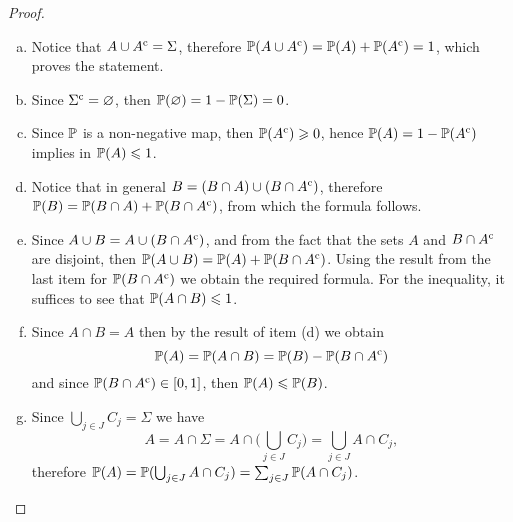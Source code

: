 \begin{proof}
    \begin{enumerate}[(a)]\setlength\itemsep{0em}
        \item Notice that \(A \cup {A}^{\text{c}} = \Sigma\), therefore \(\operatorname{\mathbb{P}}(A \cup
              {A}^{\text{c}}) = \operatorname{\mathbb{P}}(A) + \operatorname{\mathbb{P}}({A}^{\text{c}}) = 1\), which proves the statement.

        \item Since \({\Sigma}^{\text{c}} = \varnothing\), then
              \(\operatorname{\mathbb{P}}(\varnothing) = 1 - \operatorname{\mathbb{P}}(\Sigma) = 0\).

        \item Since \(\operatorname{\mathbb{P}}\) is a non-negative map, then \(\operatorname{\mathbb{P}}({A}^{\text{c}}) \geqslant 0\),
              hence \(\operatorname{\mathbb{P}}(A) = 1 - \operatorname{\mathbb{P}}({A}^{\text{c}})\) implies in \(\operatorname{\mathbb{P}}(A) \leqslant 1\).

        \item Notice that in general \(B = (B \cap A) \cup (B \cap {A}^{\text{c}})\),
              therefore \(\operatorname{\mathbb{P}}(B) = \operatorname{\mathbb{P}}(B \cap A) + \operatorname{\mathbb{P}}(B \cap {A}^{\text{c}})\), from which
              the formula follows.

        \item Since \(A \cup B = A \cup (B \cap {A}^{\text{c}})\), and from the fact that the
              sets \(A\) and \(B \cap {A}^{\text{c}}\) are disjoint, then
              \(\operatorname{\mathbb{P}}(A \cup B) = \operatorname{\mathbb{P}}(A) + \operatorname{\mathbb{P}}(B \cap {A}^{\text{c}})\). Using the result from
              the last item for \(\operatorname{\mathbb{P}}(B \cap {A}^{\text{c}})\) we obtain the required
              formula. For the inequality, it suffices to see that \(\operatorname{\mathbb{P}}(A \cap B) \leqslant 1\).

        \item Since \(A \cap B = A\) then by the result of item (d) we obtain
              \[
                  \operatorname{\mathbb{P}}(A) = \operatorname{\mathbb{P}}(A \cap B) = \operatorname{\mathbb{P}}(B) - \operatorname{\mathbb{P}}(B \cap {A}^{\text{c}})
              \]
              and since \(\operatorname{\mathbb{P}}(B \cap {A}^{\text{c}}) \in [0, 1]\), then
              \(\operatorname{\mathbb{P}}(A) \leqslant \operatorname{\mathbb{P}}(B)\).

        \item Since \(\bigcup_{j \in J} C_j = \Sigma\) we have
              \[
                  A = A \cap \Sigma = A \cap \Big( \bigcup_{j \in J} C_j \Big)
                  = \bigcup_{j \in J} A \cap C_j,
              \]
              therefore \(\operatorname{\mathbb{P}}(A) = \operatorname{\mathbb{P}}(\bigcup_{j \in J} A \cap C_j) = \sum_{j \in J}
              \operatorname{\mathbb{P}}(A \cap C_j)\).


\end{enumerate}
\end{proof}
